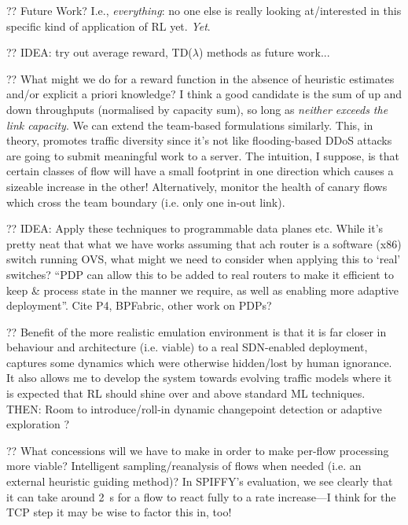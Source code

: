 \documentclass[conference, letterpaper, 10pt, times]{IEEEtran}
\begin{document}
?? Future Work? I.e., \emph{everything}: no one else is really looking at/interested in this specific kind of application of RL yet. \emph{Yet}.

?? IDEA: try out average reward, TD($\lambda$) methods as future work...

?? What might we do for a reward function in the absence of heuristic estimates and/or explicit a priori knowledge? I think a good candidate is the sum of up and down throughputs (normalised by capacity sum), so long as \emph{neither exceeds the link capacity}. We can extend the team-based formulations similarly. This, in theory, promotes traffic diversity since it's not like flooding-based DDoS attacks are going to submit meaningful work to a server. The intuition, I suppose, is that certain classes of flow will have a small footprint in one direction which causes a sizeable increase in the other! Alternatively, monitor the health of canary flows which cross the team boundary (i.e. only one in-out link).

?? IDEA: Apply these techniques to programmable data planes etc. While it's pretty neat that what we have works assuming that ach router is a software (x86) switch running OVS, what might we need to consider when applying this to `real' switches? ``PDP can allow this to be added to real routers to make it efficient to keep \& process state in the manner we require, as well as enabling more adaptive deployment''. Cite P4, BPFabric, other work on PDPs?

?? Benefit of the more realistic emulation environment is that it is far closer in behaviour and architecture (i.e. viable) to a real SDN-enabled deployment, captures some dynamics which were otherwise hidden/lost by human ignorance. It also allows me to develop the system towards evolving traffic models where it is expected that RL should shine over and above standard ML techniques. THEN: Room to introduce/roll-in dynamic changepoint detection or adaptive exploration \cite{DBLP:conf/ki/Tokic10, DBLP:conf/ki/TokicP11, DBLP:conf/annpr/TokicP12}?

?? What concessions will we have to make in order to make per-flow processing more viable? Intelligent sampling/reanalysis of flows when needed (i.e. an external heuristic guiding method)? In SPIFFY's \cite{DBLP:conf/ndss/KangGS16} evaluation, we see clearly that it can take around \SI{2}{\second} for a flow to react fully to a rate increase---I think for the TCP step it may be wise to factor this in, too!
\end{document}
